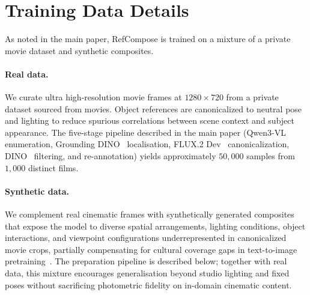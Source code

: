 \section{Training Data Details}
\label{sec:dataset}

As noted in the main paper, RefCompose is trained on a mixture of a private movie dataset and synthetic composites.

\paragraph{Real data.}
We curate ultra high-resolution movie frames at $1280 \times 720$ from a private dataset sourced from movies.
Object references are canonicalized to neutral pose and lighting to reduce spurious correlations between scene context and subject appearance.
The five-stage pipeline described in the main paper (Qwen3-VL~\cite{qwen3vl} enumeration, Grounding DINO~\cite{liu2023grounding} localisation, FLUX.2 Dev~\cite{blackforestlabs2026flux2dev} canonicalization, DINO~\cite{caron2021dino} filtering, and re-annotation) yields approximately $50{,}000$ samples from $1{,}000$ distinct films.

\paragraph{Synthetic data.}
We complement real cinematic frames with synthetically generated composites that expose the model to diverse spatial arrangements, lighting conditions, object interactions, and viewpoint configurations underrepresented in canonicalized movie crops, partially compensating for cultural coverage gaps in text-to-image pretraining~\cite{kannen2024beyond}.
The preparation pipeline is described below; together with real data, this mixture encourages generalisation beyond studio lighting and fixed poses without sacrificing photometric fidelity on in-domain cinematic content.


